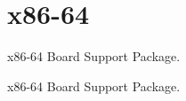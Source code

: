 \hypertarget{group__RTEMSBSPsX8664}{}\section{x86-\/64}
\label{group__RTEMSBSPsX8664}


x86-\/64 Board Support Package.  


x86-\/64 Board Support Package. 

